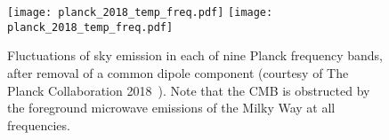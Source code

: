 \begin{figure}[htpb]
	\centering\capstart{}
	\texttt{[image: planck\_2018\_temp\_freq.pdf]}
	\texttt{[image: planck\_2018\_temp\_freq.pdf]}
	\caption[
		The 2018 Planck maps in intensity in each frequency band
	]{
		Fluctuations of sky emission in each of nine Planck frequency bands, after removal of a common dipole component (courtesy of The Planck Collaboration 2018~\cite{Planck2020}).
		Note that the CMB is obstructed by the foreground microwave emissions of the Milky Way at all frequencies.
	}\label{fig:chapter2_planck_frequency}
\end{figure}

